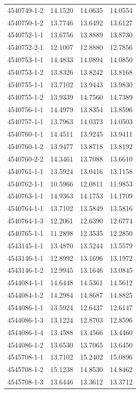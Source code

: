 \begin{longtable}{lrrr}
4540749-1-2 & 14.1520 & 14.0635 & 14.0554 \\
4540750-1-2 & 13.7746 & 13.6492 & 13.6127 \\
4540752-1-1 & 13.6756 & 13.8889 & 13.8730 \\
4540752-2-1 & 12.1007 & 12.8880 & 12.7856 \\
4540753-1-1 & 14.4833 & 14.0894 & 14.0850 \\
4540753-1-2 & 13.8326 & 13.8242 & 13.8168 \\
4540755-1-1 & 13.7102 & 13.9443 & 13.9830 \\
4540755-1-2 & 13.9339 & 14.7560 & 14.7389 \\
4540756-1-1 & 14.4979 & 13.8354 & 13.8596 \\
4540757-1-1 & 13.7963 & 14.0373 & 14.0503 \\
4540760-1-1 & 14.4511 & 13.9245 & 13.9411 \\
4540760-1-2 & 13.9477 & 13.8718 & 13.8192 \\
4540760-2-2 & 14.3461 & 13.7088 & 13.6610 \\
4540761-1-1 & 13.5924 & 13.0416 & 13.1158 \\
4540762-1-1 & 10.5966 & 12.0811 & 11.9853 \\
4540763-1-1 & 14.9363 & 14.1753 & 14.1709 \\
4540764-1-1 & 13.7102 & 13.5849 & 13.5816 \\
4540764-1-3 & 12.2061 & 12.6390 & 12.6774 \\
4540765-1-1 & 11.2898 & 12.3535 & 12.2850 \\
4543145-1-1 & 13.4870 & 13.5244 & 13.5579 \\
4543146-1-1 & 12.8992 & 13.1696 & 13.1972 \\
4543146-1-2 & 12.9945 & 13.1646 & 13.0845 \\
4544084-1-1 & 14.6448 & 14.5361 & 14.5612 \\
4544084-1-2 & 14.2984 & 14.8687 & 14.8825 \\
4544086-1-1 & 13.5924 & 12.6437 & 12.6147 \\
4544086-1-3 & 13.1224 & 12.8703 & 12.8596 \\
4544086-1-4 & 13.4588 & 13.4566 & 13.4460 \\
4544086-1-2 & 13.6530 & 13.7065 & 13.6450 \\
4545708-1-1 & 13.7102 & 15.2402 & 15.0896 \\
4545708-1-2 & 15.1238 & 14.8530 & 14.8462 \\
4545708-1-3 & 13.6446 & 13.3612 & 13.3712 \\

\end{longtable}
